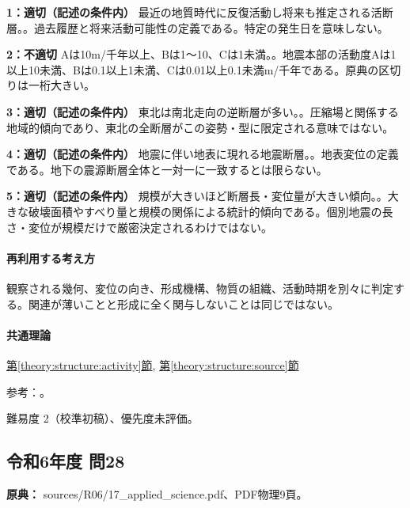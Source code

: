 \noindent\textbf{1：適切（記述の条件内）} 最近の地質時代に反復活動し将来も推定される活断層。。過去履歴と将来活動可能性の定義である。特定の発生日を意味しない。\par

\noindent\textbf{2：不適切} Aは10m/千年以上、Bは1〜10、Cは1未満。。地震本部の活動度Aは1以上10未満、Bは0.1以上1未満、Cは0.01以上0.1未満m/千年である。原典の区切りは一桁大きい。\par

\noindent\textbf{3：適切（記述の条件内）} 東北は南北走向の逆断層が多い。。圧縮場と関係する地域的傾向であり、東北の全断層がこの姿勢・型に限定される意味ではない。\par

\noindent\textbf{4：適切（記述の条件内）} 地震に伴い地表に現れる地震断層。。地表変位の定義である。地下の震源断層全体と一対一に一致するとは限らない。\par

\noindent\textbf{5：適切（記述の条件内）} 規模が大きいほど断層長・変位量が大きい傾向。。大きな破壊面積やすべり量と規模の関係による統計的傾向である。個別地震の長さ・変位が規模だけで厳密決定されるわけではない。\par

\paragraph{再利用する考え方} 観察される幾何、変位の向き、形成機構、物質の組織、活動時期を別々に判定する。関連が薄いことと形成に全く関与しないことは同じではない。

\paragraph{共通理論} \hyperref[theory:structure:activity]{第\ref*{theory:structure:activity}節}, \hyperref[theory:structure:source]{第\ref*{theory:structure:source}節}

\par 参考：\cite{str_activity,str_source}。

\par 難易度 2（校準初稿）、優先度未評価。

\subsection{令和6年度 問28}
\label{q:r06-reg-applied-28}

\noindent\textbf{原典：} sources/R06/17\_applied\_science.pdf、PDF物理9頁。

